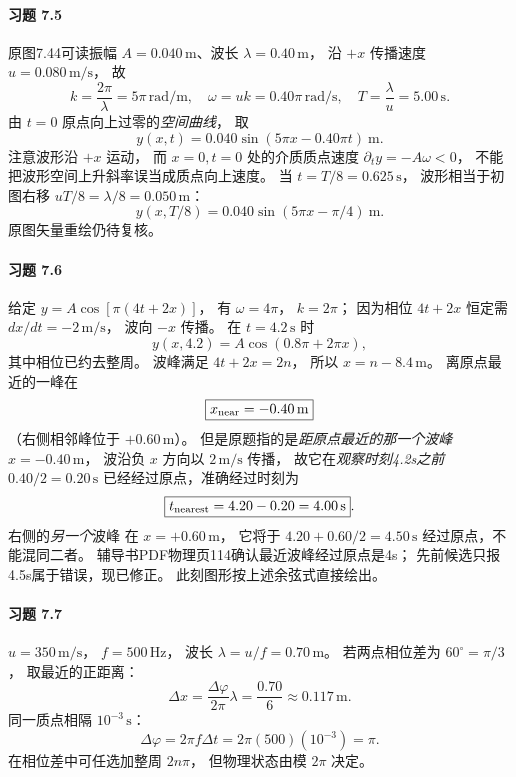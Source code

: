 \paragraph{习题 7.5}
原图7.44可读振幅
\(A=0.040\,\mathrm m\)、波长
\(\lambda=0.40\,\mathrm m\)，
沿 \(+x\) 传播速度
\(u=0.080\,\mathrm{m/s}\)，
故
\[
 k=\frac{2\pi}{\lambda}=5\pi\,\mathrm{rad/m},\quad
 \omega=uk=0.40\pi\,\mathrm{rad/s},\quad
 T=\frac{\lambda}{u}=5.00\,\mathrm s.
\]
由 \(t=0\) 原点向上过零的\emph{空间曲线}，
取
\[
 \boxed{y(x,t)=0.040\sin(5\pi x-0.40\pi t)\ \mathrm m}.
\]
注意波形沿 \(+x\) 运动，
而 \(x=0,t=0\) 处的介质质点速度
\(\partial_ty=-A\omega<0\)，
不能把波形空间上升斜率误当成质点向上速度。
当 \(t=T/8=0.625\,\mathrm s\)，
波形相当于初图右移
\(uT/8=\lambda/8=0.050\,\mathrm m\)：
\[
 \boxed{y(x,T/8)=0.040
 \sin(5\pi x-\pi/4)\ \mathrm m}.
\]
原图矢量重绘仍待复核。

\paragraph{习题 7.6}
给定
\(y=A\cos[\pi(4t+2x)]\)，
有 \(\omega=4\pi\)，
\(k=2\pi\)；
因为相位 \(4t+2x\) 恒定需
\(dx/dt=-2\,\mathrm{m/s}\)，
波向 \(-x\) 传播。
在 \(t=4.2\,\mathrm s\) 时
\[
 \boxed{y(x,4.2)=A\cos(0.8\pi+2\pi x)},
\]
其中相位已约去整周。
波峰满足 \(4t+2x=2n\)，
所以
\(x=n-8.4\,\mathrm m\)。
离原点最近的一峰在
\[
 \boxed{x_{\rm near}=-0.40\,\mathrm m}
\]
（右侧相邻峰位于 \(+0.60\,\mathrm m\)）。
但是原题指的是\emph{距原点最近的那一个波峰}
\(x=-0.40\,\mathrm m\)，
波沿负 \(x\) 方向以 \(2\,\mathrm{m/s}\) 传播，
故它在\emph{观察时刻4.2s之前}
\(0.40/2=0.20\,\mathrm s\)
已经经过原点，准确经过时刻为
\[
 \boxed{t_{\rm nearest}=4.20-0.20
 =4.00\,\mathrm s}.
\]
右侧的\emph{另一个}波峰
在 \(x=+0.60\,\mathrm m\)，
它将于 \(4.20+0.60/2=4.50\,\mathrm s\)
经过原点，不能混同二者。
辅导书PDF物理页114确认最近波峰经过原点是4s；
先前候选只报4.5s属于错误，现已修正。
此刻图形按上述余弦式直接绘出。

\paragraph{习题 7.7}
\(u=350\,\mathrm{m/s}\)，
\(f=500\,\mathrm{Hz}\)，
波长 \(\lambda=u/f=0.70\,\mathrm m\)。
若两点相位差为
\(60^\circ=\pi/3\)，
取最近的正距离：
\[
 \boxed{\Delta x=\frac{\Delta\varphi}{2\pi}\lambda
 =\frac{0.70}{6}\approx0.117\,\mathrm m}.
\]
同一质点相隔 \(10^{-3}\,\mathrm s\)：
\[
 \boxed{\Delta\varphi
 =2\pi f\Delta t
 =2\pi(500)(10^{-3})=\pi}.
\]
在相位差中可任选加整周 \(2n\pi\)，
但物理状态由模 \(2\pi\) 决定。

